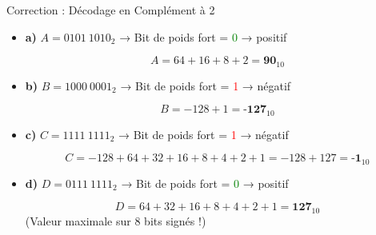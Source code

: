 \documentclass[aspectratio=1610]{beamer}
\begin{document}
\begin{frame}{Correction : Décodage en Complément à 2}

  \begin{itemize}
    \item \textbf{a)} $A = 0101\ 1010_2$ → Bit de poids fort = \textcolor{green}{0} → positif

    \[
      A = 64 + 16 + 8 + 2 = \textbf{90}_{10}
    \]

    \pause
    \item \textbf{b)} $B = 1000\ 0001_2$ → Bit de poids fort = \textcolor{red}{1} → négatif

    \[
      B = -128 + 1 = \textbf{-127}_{10}
    \]

    \pause
    \item \textbf{c)} $C = 1111\ 1111_2$ → Bit de poids fort = \textcolor{red}{1} → négatif

    \[
      C = -128 + 64 + 32 + 16 + 8 + 4 + 2 + 1 = -128 + 127 = \textbf{-1}_{10}
    \]

    \pause
    \item \textbf{d)} $D = 0111\ 1111_2$ → Bit de poids fort = \textcolor{green}{0} → positif

    \[
      D = 64 + 32 + 16 + 8 + 4 + 2 + 1 = \textbf{127}_{10}
    \]
    (Valeur maximale sur 8 bits signés !)
  \end{itemize}

\end{frame}
\end{document}
